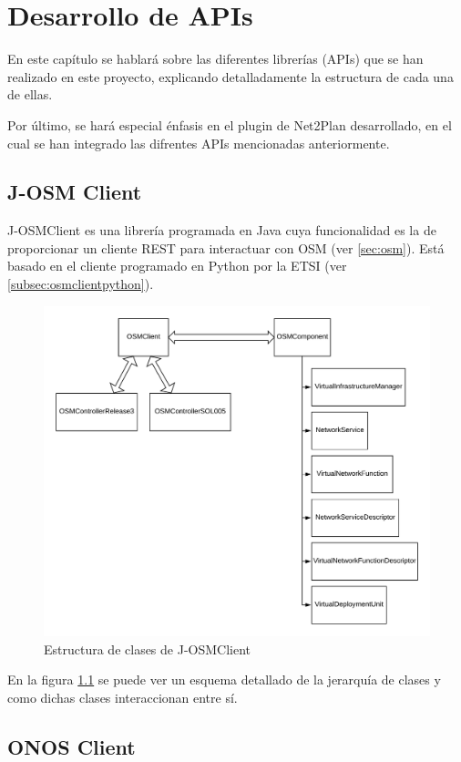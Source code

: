 \chapter{Desarrollo de APIs}

En este capítulo se hablará sobre las diferentes librerías (APIs) que se han realizado en este proyecto, explicando detalladamente la estructura de cada una de ellas.

Por último, se hará especial énfasis en el plugin de Net2Plan desarrollado, en el cual se han integrado las difrentes APIs mencionadas anteriormente.


\section{J-OSM Client}
\label{sec:osmclient}

J-OSMClient es una librería programada en Java cuya funcionalidad es la de proporcionar un cliente REST para interactuar con OSM (ver \ref{sec:osm}). Está basado en el cliente programado en Python por la ETSI (ver \ref{subsec:osmclientpython}).

\begin{figure}[!ht]
	\centering
	\includegraphics[width=0.8\linewidth]{imagenes/OSMClient}
	\caption{Estructura de clases de J-OSMClient}
	\label{fig:osmclient}
\end{figure}

En la figura \ref{fig:osmclient} se puede ver un esquema detallado de la jerarquía de clases y como dichas clases interaccionan entre sí.


\section{ONOS Client}
\label{sec:onosclient}

